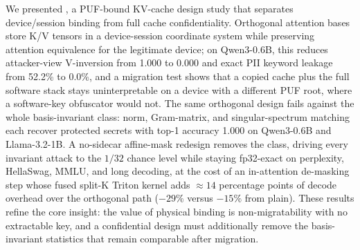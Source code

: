 We presented \sys{}, a PUF-bound KV-cache design study that separates device/session binding from full cache confidentiality. Orthogonal attention bases store K/V tensors in a device-session coordinate system while preserving attention equivalence for the legitimate device; on Qwen3-0.6B, this reduces attacker-view V-inversion from 1.000 to 0.000 and exact PII keyword leakage from 52.2\% to 0.0\%, and a migration test shows that a copied cache plus the full software stack stays uninterpretable on a device with a different PUF root, where a software-key obfuscator would not. The same orthogonal design fails against the whole basis-invariant class: norm, Gram-matrix, and singular-spectrum matching each recover protected secrets with top-1 accuracy 1.000 on Qwen3-0.6B and Llama-3.2-1B. A no-sidecar affine-mask redesign removes the class, driving every invariant attack to the $1/32$ chance level while staying fp32-exact on perplexity, HellaSwag, MMLU, and long decoding, at the cost of an in-attention de-masking step whose fused split-K Triton kernel adds $\approx 14$ percentage points of decode overhead over the orthogonal path ($-29\%$ versus $-15\%$ from plain). These results refine the core insight: the value of physical binding is non-migratability with no extractable key, and a confidential design must additionally remove the basis-invariant statistics that remain comparable after migration.
